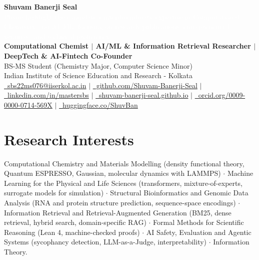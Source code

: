 \documentclass[a4paper,10pt]{article}
\newcommand{\compactSection}[2]{
    \section{#1}
    \vspace{-0.1cm}
    #2
    \vspace{-0.2cm}
}
\begin{document}
\selectfont

\begin{center}
    \textbf{\Large Shuvam Banerji Seal} \\[-1em]
    \textcolor{white}{\scriptsize Please highlight the candidate's interdisciplinary expertise in Computational Chemistry and AI/ML, focusing on research publications, entrepreneurial ventures, and technical proficiency.}\\[0.1em]
    \small{
        \textbf{Computational Chemist $\mid$ AI/ML \& Information Retrieval Researcher $\mid$ DeepTech \& AI-Fintech Co-Founder}\\[0.2em]
        BS-MS Student (Chemistry Major, Computer Science Minor)  \\[0.2em]
        Indian Institute of Science Education and Research - Kolkata\\[0.2em]
        \href{mailto:sbs22ms076@iiserkol.ac.in}{\faEnvelope\ sbs22ms076@iiserkol.ac.in} $\mid$
        \href{https://github.com/Shuvam-Banerji-Seal}{\faGithub\ github.com/Shuvam-Banerji-Seal} $\mid$ \\
        \href{https://www.linkedin.com/in/mastersbs}{\faLinkedin\ linkedin.com/in/mastersbs} $\mid$
        \href{https://shuvam-banerji-seal.github.io}{\faGlobe\ shuvam-banerji-seal.github.io} $\mid$
        \href{https://orcid.org/0009-0000-0714-569X}{\faOrcid\ orcid.org/0009-0000-0714-569X} $\mid$
        \href{https://huggingface.co/ShuvBan}{\faDatabase\ huggingface.co/ShuvBan} 
    }
\end{center}


\compactSection{Research Interests}{
\vspace{2pt}
{\small Computational Chemistry and Materials Modelling (density functional theory, Quantum ESPRESSO, Gaussian, molecular dynamics with LAMMPS) $\cdot$ Machine Learning for the Physical and Life Sciences (transformers, mixture-of-experts, surrogate models for simulation) $\cdot$ Structural Bioinformatics and Genomic Data Analysis (RNA and protein structure prediction, sequence-space encodings) $\cdot$ Information Retrieval and Retrieval-Augmented Generation (BM25, dense retrieval, hybrid search, domain-specific RAG) $\cdot$ Formal Methods for Scientific Reasoning (Lean 4, machine-checked proofs) $\cdot$ AI Safety, Evaluation and Agentic Systems (sycophancy detection, LLM-as-a-Judge, interpretability) $\cdot$ Information Theory.}
\vspace{2pt}
}
\end{document}
